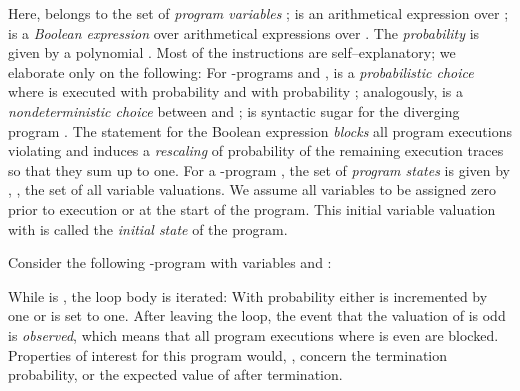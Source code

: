 Here,  belongs to the set of \emph{program variables} ;  is an arithmetical expression over ;  is a \emph{Boolean expression} over arithmetical expressions over . The \emph{probability} is given by a polynomial .
 Most of the \cpGCL instructions are self--explanatory; we elaborate only on the following: For \cpGCL-programs  and ,  is a \emph{probabilistic choice} where  is executed with probability  and  with probability ; analogously,  is a \emph{nondeterministic choice} between  and ;  \Abort is syntactic sugar for the diverging program . The statement  for the Boolean expression  \emph{blocks} all program executions violating  and induces a \emph{rescaling} of probability of the
remaining execution traces so that they sum up to one. 
For a \cpGCL-program , the set of \emph{program states} is given by , 
\ie, the set of all  variable valuations. We assume all variables to be assigned zero prior to execution or at the start of the program. This initial variable valuation  with  is called the \emph{initial state} of the program. 
\begin{example}\label{ex:simple}
	Consider the following \cpGCL-program with variables  and :
	
\begin{CenteredBox}
				
			\end{CenteredBox}

\noindent While  is , the loop body is iterated: With probability  either  is incremented by one or  is set to one. After leaving the loop, the event that the valuation of  is odd is \emph{observed}, which means that all program executions where  is even are blocked. 
	Properties of interest for this program would, \eg, concern the termination probability, or the expected value of  after termination.
\hfill
\end{example}





